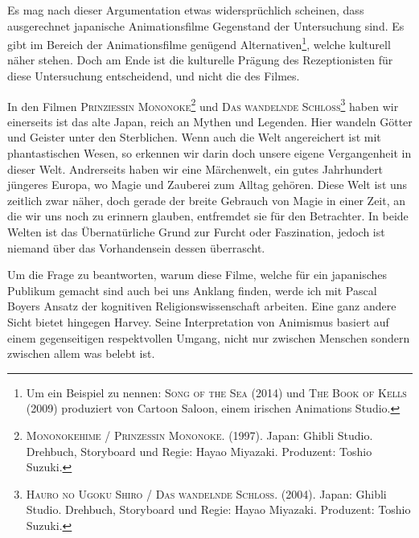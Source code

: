 Es mag nach dieser Argumentation etwas widersprüchlich scheinen, dass ausgerechnet japanische Animationsfilme Gegenstand der Untersuchung sind. Es gibt im Bereich der Animationsfilme genügend Alternativen\footnote{Um ein Beispiel zu nennen: \textsc{Song of the Sea} (2014) und \textsc{The Book of Kells} (2009) produziert von Cartoon Saloon, einem irischen Animations Studio.}, welche kulturell näher stehen. Doch am Ende ist die kulturelle Prägung des Rezeptionisten für diese Untersuchung entscheidend, und nicht die des Filmes. 

In den Filmen \textsc{Prinziessin Mononoke}\footnote{\textsc{Mononokehime / Prinzessin Mononoke}. (1997). Japan: Ghibli Studio. Drehbuch, Storyboard und Regie: Hayao Miyazaki. Produzent: Toshio Suzuki.} und \textsc{Das wandelnde Schloss}\footnote{\textsc{Hauro no Ugoku Shiro / Das wandelnde Schloss}. (2004). Japan: Ghibli Studio. Drehbuch, Storyboard und Regie: Hayao Miyazaki. Produzent: Toshio Suzuki.} haben wir einerseits ist das alte Japan, reich an Mythen und Legenden. Hier wandeln Götter und Geister unter den Sterblichen. Wenn auch die Welt angereichert ist mit phantastischen Wesen, so erkennen wir darin doch unsere eigene Vergangenheit in dieser Welt. Andrerseits haben wir eine Märchenwelt, ein gutes Jahrhundert jüngeres Europa, wo Magie und Zauberei zum Alltag gehören. Diese Welt ist uns zeitlich zwar näher, doch gerade der breite Gebrauch von Magie in einer Zeit, an die wir uns noch zu erinnern glauben, entfremdet sie für den Betrachter. In beide Welten ist das Übernatürliche Grund zur Furcht oder Faszination, jedoch ist niemand über das Vorhandensein dessen überrascht.

Um die Frage zu beantworten, warum diese Filme, welche für ein japanisches Publikum gemacht sind auch bei uns Anklang finden, werde ich mit Pascal Boyers Ansatz der kognitiven Religionswissenschaft arbeiten. Eine ganz andere Sicht bietet hingegen Harvey. Seine Interpretation von Animismus basiert auf einem gegenseitigen respektvollen Umgang, nicht nur zwischen Menschen sondern zwischen allem was belebt ist.

\medskip

